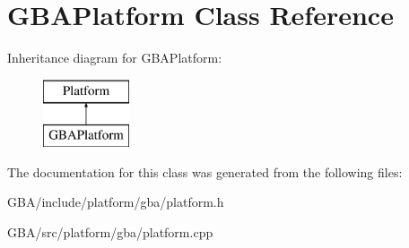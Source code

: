 \hypertarget{class_g_b_a_platform}{\section{G\-B\-A\-Platform Class Reference}
\label{class_g_b_a_platform}
}
Inheritance diagram for G\-B\-A\-Platform\-:\begin{figure}[H]
\begin{center}
\leavevmode
\includegraphics[height=2.000000cm]{class_g_b_a_platform}
\end{center}
\end{figure}


The documentation for this class was generated from the following files\-:\begin{DoxyCompactItemize}
\item 
G\-B\-A/include/platform/gba/platform.\-h\item 
G\-B\-A/src/platform/gba/platform.\-cpp\end{DoxyCompactItemize}
